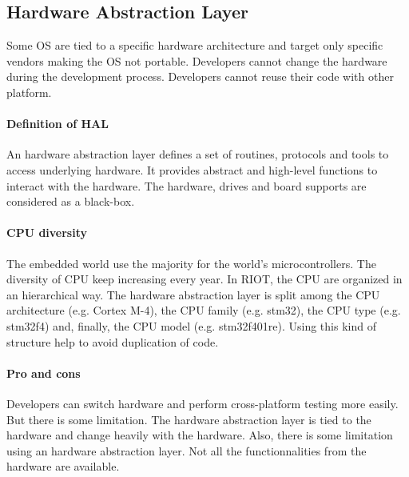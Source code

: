 \subsection{Hardware Abstraction Layer}
Some OS are tied to a specific hardware architecture and target only specific vendors making the OS not portable. Developers cannot change the hardware during the development process. Developers cannot reuse their code with other platform. 

\paragraph{Definition of HAL}
An hardware abstraction layer defines a set of routines, protocols and tools to access underlying hardware. It provides abstract and high-level functions to interact with the hardware. The hardware, drives and board supports are considered as a black-box.


\paragraph{CPU diversity}
The embedded world use the majority for the world's microcontrollers. The diversity of CPU keep increasing every year. 
In RIOT, the CPU are organized in an hierarchical way. The hardware abstraction layer is split among the CPU architecture (e.g. Cortex M-4), the CPU family (e.g. stm32), the CPU type (e.g. stm32f4) and, finally, the CPU model (e.g. stm32f401re).
Using this kind of structure help to avoid duplication of code.

\paragraph{Pro and cons}
Developers can switch hardware and perform cross-platform testing more easily. But there is some limitation. The hardware abstraction layer is tied to the hardware and change heavily with the hardware. Also, there is some limitation using an hardware abstraction layer. Not all the functionnalities from the hardware are available. 